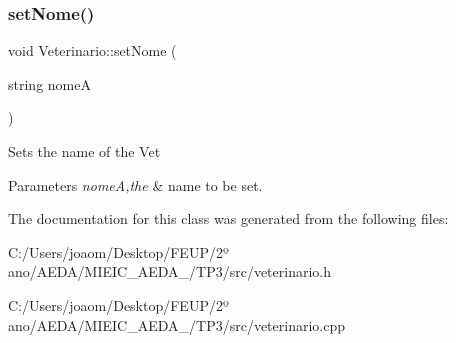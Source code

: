 \subsubsection{\texorpdfstring{set\+Nome()}{setNome()}}
{\footnotesize\ttfamily void Veterinario\+::set\+Nome (\begin{DoxyParamCaption}\item[{string}]{nomeA }\end{DoxyParamCaption})}

Sets the name of the Vet 
\begin{DoxyParams}{Parameters}
{\em nomeA,the} & name to be set. \\
\hline
\end{DoxyParams}


The documentation for this class was generated from the following files\+:\begin{DoxyCompactItemize}
\item 
C\+:/\+Users/joaom/\+Desktop/\+F\+E\+U\+P/2º ano/\+A\+E\+D\+A/\+M\+I\+E\+I\+C\+\_\+\+A\+E\+D\+A\+\_/\+T\+P3/src/veterinario.\+h\item 
C\+:/\+Users/joaom/\+Desktop/\+F\+E\+U\+P/2º ano/\+A\+E\+D\+A/\+M\+I\+E\+I\+C\+\_\+\+A\+E\+D\+A\+\_/\+T\+P3/src/veterinario.\+cpp\end{DoxyCompactItemize}

